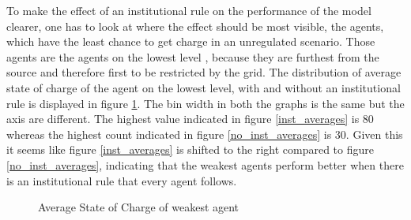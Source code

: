 \documentclass[a4paper]{article}
\begin{document}
To make the effect of an institutional rule on the performance of the model clearer, one has to look at where the effect should be most visible, 
the agents, which have the least chance to get charge in an unregulated scenario. Those agents are the agents on the lowest level ,
because they are furthest from the source and therefore first to be restricted by the grid.
The distribution of average state of charge of the agent on the lowest level, with and without an institutional
rule is displayed in figure \ref{inst_averages_second}. The bin width in both the graphs is the same but the axis are different. 
The highest value indicated in figure \ref{inst_averages} is 80  whereas the highest count indicated in figure \ref{no_inst_averages}
is 30. Given this it seems like figure \ref{inst_averages} is shifted to the right compared to figure \ref{no_inst_averages},
indicating that the weakest agents perform better when there is an institutional rule that every agent follows. \\
\begin{figure}[!ht]
\caption{Average State of Charge of weakest agent}
\label{inst_averages_second}
\end{figure}
\end{document}
